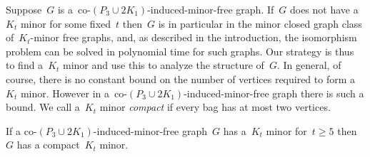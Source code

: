 \documentclass[envcountsame,envcountsect,11pt,a4paper]{llncs}
\begin{document}
Suppose~$G$ is a~co-$(P_{3} \cup 2 K_{1})$-induced-minor-free graph. If~$G$ does not have a~$K_t$ minor for some fixed~$t$ then~$G$ is in particular in the minor closed graph class of~$K_t$-minor free graphs, and, as described in the introduction, the isomorphism problem can be solved in polynomial time for such graphs. 
Our strategy is thus to find a~$K_t$ minor and use this to analyze the structure of~$G$. In general, of course, there is no constant bound
on the number of vertices required to form a~$K_t$ minor. However in a~co-$(P_{3} \cup 2 K_{1})$-induced-minor-free graph there is such a
bound. We call a~$K_t$ minor \emph{compact} if every bag has at most two vertices.

\begin{lemma}\label{thm:existence:of:compact:minors}
If a co-$(P_{3} \cup 2 K_{1})$-induced-minor-free graph~$G$ has a~$K_t$ minor for~$t\geq 5$ then~$G$ has a compact~$K_t$ minor.
\end{lemma}
\end{document}
